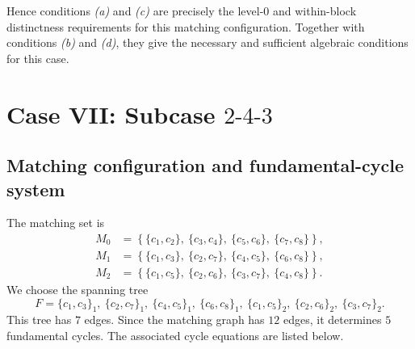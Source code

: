 \documentclass[11pt]{article}
\begin{document}
Hence conditions \emph{(a)} and \emph{(c)} are precisely the level-$0$ and within-block distinctness requirements for this matching configuration.  Together with conditions \emph{(b)} and \emph{(d)}, they give the necessary and sufficient algebraic conditions for this case.
\section{Case VII: Subcase $2\text{-}4\text{-}3$}
\subsection{Matching configuration and fundamental-cycle system}
The matching set is
\[
\begin{aligned}
M_0&=\left\{\{c_{1},c_{2}\},\ \{c_{3},c_{4}\},\ \{c_{5},c_{6}\},\ \{c_{7},c_{8}\}\right\},\\
M_1&=\left\{\{c_{1},c_{3}\},\ \{c_{2},c_{7}\},\ \{c_{4},c_{5}\},\ \{c_{6},c_{8}\}\right\},\\
M_2&=\left\{\{c_{1},c_{5}\},\ \{c_{2},c_{6}\},\ \{c_{3},c_{7}\},\ \{c_{4},c_{8}\}\right\}.
\end{aligned}
\]
We choose the spanning tree
\[
F={\{c_{1},c_{3}\}_{1},\ \{c_{2},c_{7}\}_{1},\ \{c_{4},c_{5}\}_{1},\ \{c_{6},c_{8}\}_{1},\ \{c_{1},c_{5}\}_{2},\ \{c_{2},c_{6}\}_{2},\ \{c_{3},c_{7}\}_{2}}.
\]
This tree has $7$ edges.  Since the matching graph has $12$ edges, it determines $5$ fundamental cycles.  The associated cycle equations are listed below.
\end{document}
